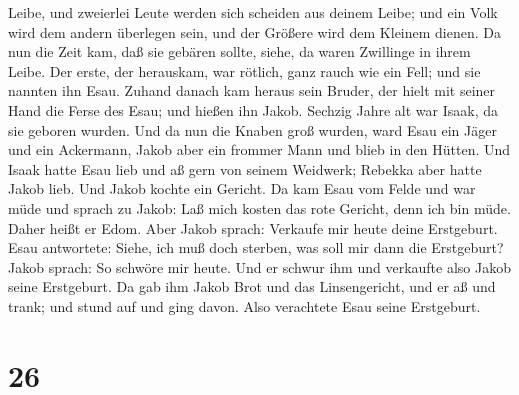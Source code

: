 Leibe, und zweierlei Leute werden sich scheiden aus deinem Leibe; und
ein Volk wird dem andern überlegen sein, und der Größere wird dem
Kleinem dienen.  Da nun die Zeit kam, daß sie gebären
sollte, siehe, da waren Zwillinge in ihrem Leibe.  Der
erste, der herauskam, war rötlich, ganz rauch wie ein Fell; und sie
nannten ihn Esau.  Zuhand danach kam heraus sein Bruder,
der hielt mit seiner Hand die Ferse des Esau; und hießen ihn Jakob.
Sechzig Jahre alt war Isaak, da sie geboren wurden.  Und da
nun die Knaben groß wurden, ward Esau ein Jäger und ein Ackermann, Jakob
aber ein frommer Mann und blieb in den Hütten.  Und Isaak
hatte Esau lieb und aß gern von seinem Weidwerk; Rebekka aber hatte
Jakob lieb.  Und Jakob kochte ein Gericht. Da kam Esau vom
Felde und war müde  und sprach zu Jakob: Laß mich kosten
das rote Gericht, denn ich bin müde. Daher heißt er Edom. 
Aber Jakob sprach: Verkaufe mir heute deine Erstgeburt. 
Esau antwortete: Siehe, ich muß doch sterben, was soll mir dann die
Erstgeburt?  Jakob sprach: So schwöre mir heute. Und er
schwur ihm und verkaufte also Jakob seine Erstgeburt.  Da
gab ihm Jakob Brot und das Linsengericht, und er aß und trank; und stund
auf und ging davon. Also verachtete Esau seine Erstgeburt.

\hypertarget{section-25}{%
\section{26}\label{section-25}}

